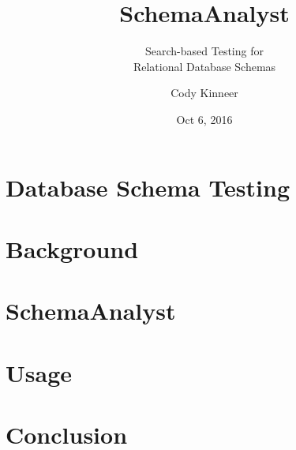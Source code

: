 \documentclass[hyperref]{beamer}
\title{SchemaAnalyst}
\subtitle{Search-based Testing for \\Relational Database Schemas}
\author[Kinneer]{Cody Kinneer}
\institute[Carnegie Mellon University]{Institute for Software Research \\ Carnegie Mellon University}
\date[Sept 23, 2016]{Oct 6, 2016}
\begin{document}
\begin{frame}
  \titlepage
\end{frame}


\section{Database Schema Testing}


\section{Background}


\section{SchemaAnalyst}


\section{Usage}


\section{Conclusion}

\end{document}
